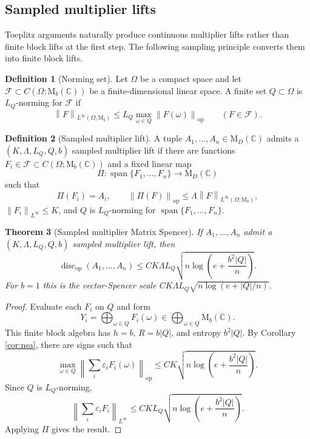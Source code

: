 \documentclass[11pt]{amsart}
\numberwithin{equation}{section}
\newtheorem{theorem}{Theorem}[section]
\theoremstyle{definition}
\newtheorem{definition}[theorem]{Definition}
\theoremstyle{remark}
\newcommand{\C}{\mathbb C}
\newcommand{\M}{\mathrm M}
\newcommand{\op}{\mathrm{op}}
\newcommand{\Span}{\operatorname{span}}
\newcommand{\discop}{\operatorname{disc}_{\op}}
\newcommand{\norm}[1]{\left\lVert #1\right\rVert}
\newcommand{\eps}{\varepsilon}
\newcommand{\mcF}{\mathcal F}
\begin{document}
\subsection{Sampled multiplier lifts}

Toeplitz arguments naturally produce continuous multiplier lifts rather than
finite block lifts at the first step. The following sampling principle converts
them into finite block lifts.

\begin{definition}[Norming set]
Let $\Omega$ be a compact space and let
$\mcF\subset C(\Omega;\M_b(\C))$ be a finite-dimensional linear space. A finite
set $Q\subset\Omega$ is $L_Q$-norming for $\mcF$ if
\[
\norm{F}_{L^\infty(\Omega;\M_b)}
\le L_Q\max_{\omega\in Q}\norm{F(\omega)}_{\op}
\qquad(F\in\mcF).
\]
\end{definition}

\begin{definition}[Sampled multiplier lift]
A tuple $A_1,\ldots,A_n\in\M_D(\C)$ admits a
$(K,\Lambda,L_Q,Q,b)$ sampled multiplier lift if there are functions
$F_i\in\mcF\subset C(\Omega;\M_b(\C))$ and a fixed linear map
\[
\Pi:\Span\{F_1,\ldots,F_n\}\to\M_D(\C)
\]
such that
\[
\Pi(F_i)=A_i,
\qquad
\norm{\Pi(F)}_{\op}\le \Lambda\norm{F}_{L^\infty(\Omega;\M_b)},
\]
$\norm{F_i}_{L^\infty}\le K$, and $Q$ is $L_Q$-norming for
$\Span\{F_1,\ldots,F_n\}$.
\end{definition}

\begin{theorem}[Sampled multiplier Matrix Spencer]\label{thm:sampled}
If $A_1,\ldots,A_n$ admit a $(K,\Lambda,L_Q,Q,b)$ sampled multiplier lift, then
\[
\discop(A_1,\ldots,A_n)
\le C K\Lambda L_Q
\sqrt{n\log\left(e+\frac{b^2|Q|}{n}\right)} .
\]
For $b=1$ this is the vector-Spencer scale
$CK\Lambda L_Q\sqrt{n\log(e+|Q|/n)}$.
\end{theorem}

\begin{proof}
Evaluate each $F_i$ on $Q$ and form
\[
Y_i=\bigoplus_{\omega\in Q}F_i(\omega)
\in \bigoplus_{\omega\in Q}\M_b(\C).
\]
This finite block algebra has $h=b$, $R=b|Q|$, and entropy $b^2|Q|$. By
Corollary \ref{cor:nsa}, there are signs such that
\[
\max_{\omega\in Q}
\norm{\sum_i\eps_iF_i(\omega)}_{\op}
\le C K\sqrt{n\log\left(e+\frac{b^2|Q|}{n}\right)} .
\]
Since $Q$ is $L_Q$-norming,
\[
\norm{\sum_i\eps_iF_i}_{L^\infty}
\le C K L_Q\sqrt{n\log\left(e+\frac{b^2|Q|}{n}\right)} .
\]
Applying $\Pi$ gives the result.
\end{proof}
\end{document}
